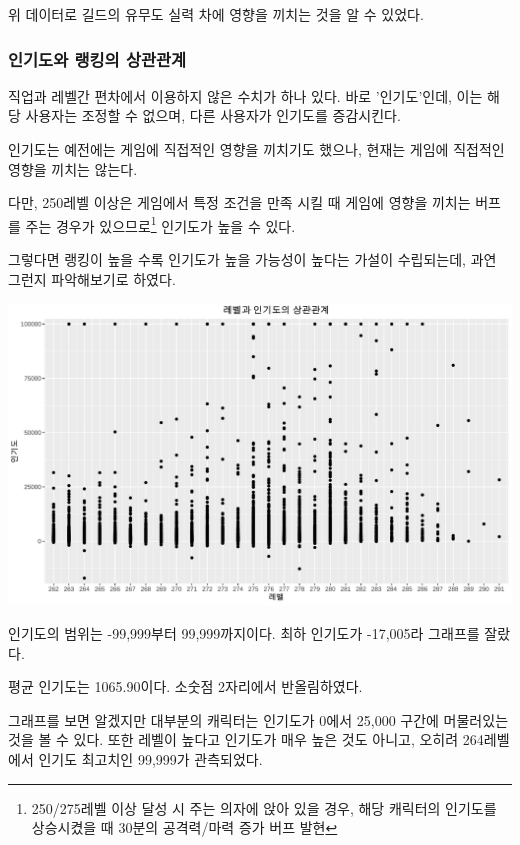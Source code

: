 \documentclass[
]{article}
\begin{document}
위 데이터로 길드의 유무도 실력 차에 영향을 끼치는 것을 알 수 있었다.

\hypertarget{uxc778uxae30uxb3c4uxc640-uxb7aduxd0b9uxc758-uxc0c1uxad00uxad00uxacc4}{%
\subsubsection{인기도와 랭킹의
상관관계}\label{uxc778uxae30uxb3c4uxc640-uxb7aduxd0b9uxc758-uxc0c1uxad00uxad00uxacc4}}

직업과 레벨간 편차에서 이용하지 않은 수치가 하나 있다. 바로
'인기도'인데, 이는 해당 사용자는 조정할 수 없으며, 다른 사용자가
인기도를 증감시킨다.

인기도는 예전에는 게임에 직접적인 영향을 끼치기도 했으나, 현재는 게임에
직접적인 영향을 끼치는 않는다.

다만, 250레벨 이상은 게임에서 특정 조건을 만족 시킬 때 게임에 영향을
끼치는 버프를 주는 경우가 있으므로\footnote{250/275레벨 이상 달성 시
  주는 의자에 앉아 있을 경우, 해당 캐릭터의 인기도를 상승시켰을 때
  30분의 공격력/마력 증가 버프 발현} 인기도가 높을 수 있다.

그렇다면 랭킹이 높을 수록 인기도가 높을 가능성이 높다는 가설이
수립되는데, 과연 그런지 파악해보기로 하였다.

\includegraphics{123_files/figure-latex/ranking_all_inki-1.pdf}

인기도의 범위는 -99,999부터 99,999까지이다. 최하 인기도가 -17,005라
그래프를 잘랐다.

평균 인기도는 1065.90이다. 소숫점 2자리에서 반올림하였다.

그래프를 보면 알겠지만 대부분의 캐릭터는 인기도가 0에서 25,000 구간에
머물러있는것을 볼 수 있다. 또한 레벨이 높다고 인기도가 매우 높은 것도
아니고, 오히려 264레벨에서 인기도 최고치인 99,999가 관측되었다.
\end{document}
